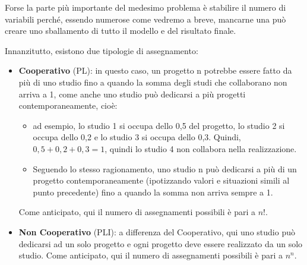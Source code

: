 \documentclass[12pt, a4paper]{article}
\begin{document}
	Forse la parte più importante del medesimo problema è stabilire il numero di variabili perché, essendo numerose come vedremo a breve, mancarne una può creare uno sballamento di tutto il modello e del risultato finale.
	
	Innanzitutto, esistono due tipologie di assegnamento:
	\begin{itemize}
		\item \textbf{Cooperativo} (PL): in questo caso, un progetto n potrebbe essere fatto da più di uno studio fino a quando la somma degli studi che collaborano non arriva a 1, come anche uno studio può dedicarsi a più progetti contemporaneamente, cioè: 
		\begin{itemize}
			\item ad esempio, lo studio 1 si occupa dello 0,5 del progetto, lo studio 2 si occupa dello 0,2 e lo studio 3 si occupa dello 0,3. Quindi, $0,5+0,2+0,3=1$, quindi lo studio 4 non collabora nella realizzazione.
			\item Seguendo lo stesso ragionamento, uno studio n può dedicarsi a più di un progetto contemporaneamente (ipotizzando valori e situazioni simili al punto precedente) fino a quando la somma non arriva sempre a 1.
		\end{itemize}
		Come anticipato, qui il numero di assegnamenti possibili è pari a $n!$.
		\item \textbf{Non Cooperativo} (PLI): a differenza del Cooperativo, qui uno studio può dedicarsi ad un solo progetto e ogni progetto deve essere realizzato da un solo studio. Come anticipato, qui il numero di assegnamenti possibili è pari a $n^n$.
	\end{itemize}
	
\end{document}
